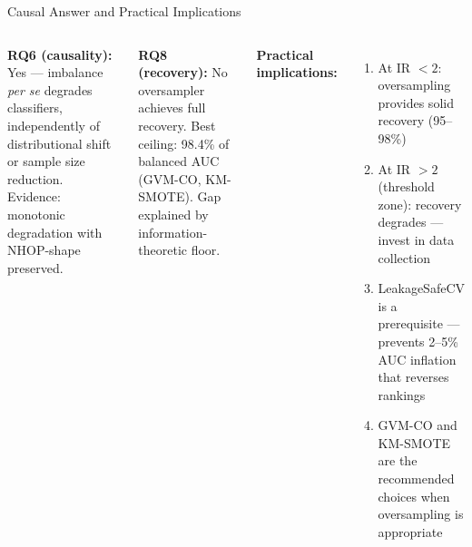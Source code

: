 \documentclass[aspectratio=169,10pt]{beamer}
\begin{document}
\begin{frame}{Causal Answer and Practical Implications}
\begin{columns}[T]
\textbf{RQ6 (causality):} Yes — imbalance \emph{per se} degrades classifiers, independently of distributional shift or sample size reduction. Evidence: monotonic degradation with NHOP-shape preserved.

\vspace{8pt}
\textbf{RQ8 (recovery):} No oversampler achieves full recovery. Best ceiling: 98.4\% of balanced AUC (GVM-CO, KM-SMOTE). Gap explained by information-theoretic floor.

\textbf{Practical implications:}
\begin{enumerate}
  \item At IR $< 2$: oversampling provides solid recovery (95--98\%)
  \item At IR $> 2$ (threshold zone): recovery degrades — invest in data collection
  \item LeakageSafeCV is a prerequisite — prevents 2--5\% AUC inflation that reverses rankings
  \item GVM-CO and KM-SMOTE are the recommended choices when oversampling is appropriate
\end{enumerate}
\end{columns}
\end{frame}
\end{document}
